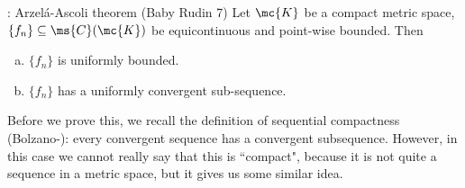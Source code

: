 \begin{ntheorem}{: Arzel\'a-Ascoli theorem (Baby Rudin 7)}
	Let \(\mc{K}\) be a compact metric space, \(\{f_n\}\subseteq \ms{C}(\mc{K})\) be equicontinuous and point-wise bounded. Then
	\begin{enumerate}[(a)]
		\item \(\{f_n\}\) is uniformly bounded.
		
		\item \(\{f_n\}\) has a uniformly convergent sub-sequence.
	\end{enumerate}
\end{ntheorem}
Before we prove this, we recall the definition of sequential compactness (Bolzano-\Weierstass): every convergent sequence has a convergent subsequence. However, in this case we cannot really say that this is ``compact", because it is not quite a sequence in a metric space, but it gives us some similar idea.
